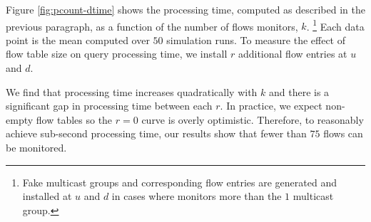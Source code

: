 


Figure \ref{fig:pcount-dtime} shows the processing time, computed as described in the previous paragraph, as a function of the number of flows \pcnt monitors, $k$.
\footnote{Fake multicast groups and corresponding flow entries are generated and installed at $u$ and $d$ in cases where \pcnt monitors more than the $1$ multicast group.}
Each data point is the mean computed over $50$ simulation runs. To measure the effect of flow table size on query processing time, we install $r$ additional flow entries at $u$ and $d$.

We find that processing time increases quadratically with $k$ and there is a significant gap in processing time between each $r$.  In practice, we expect non-empty flow tables so the $r=0$ curve
is overly optimistic.  Therefore, to reasonably achieve sub-second processing time, our results show that fewer than $75$ flows can be monitored. 

